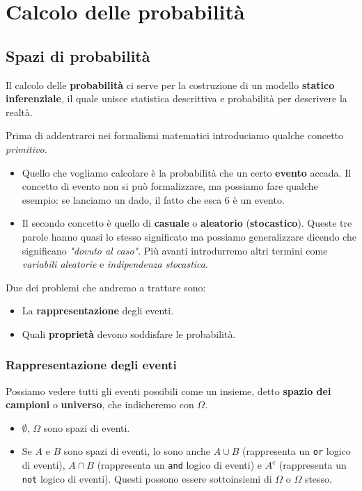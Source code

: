 \part{Calcolo delle probabilità}

\chapter{Spazi di probabilità}
Il calcolo delle \textbf{probabilità} ci serve per la costruzione di un modello
\textbf{statico inferenziale}, il quale unisce statistica descrittiva e probabilità per descrivere la
realtà.

Prima di addentrarci nei formalismi matematici introduciamo qualche concetto \emph{primitivo}.
\begin{itemize}
	\item Quello che vogliamo calcolare è la probabilità che un certo \textbf{evento} accada. Il concetto
	      di evento non si può formalizzare, ma possiamo fare qualche esempio: se lanciamo un dado, il
	      fatto che esca 6 è un evento.
	\item Il secondo concetto è quello di \textbf{casuale} o \textbf{aleatorio} (\textbf{stocastico}).
	      Queste tre parole hanno quasi lo stesso significato ma possiamo generalizzare dicendo che
	      significano \emph{"dovuto al caso"}. Più avanti introdurremo altri termini come
	      \emph{variabili aleatorie} e \emph{indipendenza stocastica}.
\end{itemize}
Due dei problemi che andremo a trattare sono:
\begin{itemize}
	\item La \textbf{rappresentazione} degli eventi.
	\item Quali \textbf{proprietà} devono soddisfare le probabilità.
\end{itemize}

\section{Rappresentazione degli eventi}
Possiamo vedere tutti gli eventi possibili come un insieme, detto \textbf{spazio dei campioni} o
\textbf{universo}, che indicheremo con $\Omega$.
\begin{itemize}
	\item $\emptyset$, $\Omega$ sono spazi di eventi.
	\item Se $A$ e $B$ sono spazi di eventi, lo sono anche $A \cup B$ (rappresenta un \verb|or| logico di
	      eventi), $A \cap B$ (rappresenta un \verb|and| logico di eventi) e $A^c$ (rappresenta un
	      \verb|not| logico di eventi). Questi possono essere sottoinsiemi di $\Omega$ o $\Omega$ stesso.
\end{itemize}

